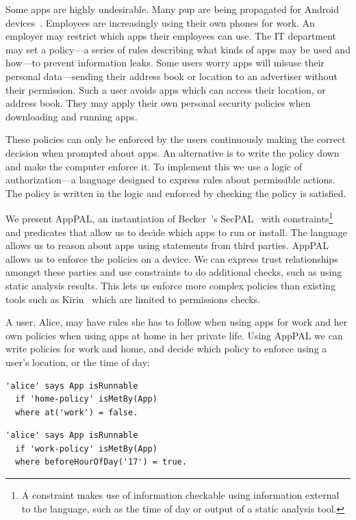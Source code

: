 \documentclass[]{llncs}
\begin{document}
Some apps are highly undesirable.
Many \ac{pup} are being propagated for Android devices~\cite{Truong:2014bi,Svajcer:2013tp}.
Employees are increasingly using their own phones for work.
An employer may restrict which apps their employees can use.
The IT department may set a policy---a series of rules describing what kinds of apps may be used and how---to prevent information leaks.
Some users worry apps will misuse their personal data---sending their address book or location to an advertiser without their permission.
Such a user avoids apps which can access their location, or address book.
They may apply their own personal security policies when downloading and running apps.

These policies can only be enforced by the users continuously making the correct decision when prompted about apps.
An alternative is to write the policy down and make the computer enforce it.
To implement this we use a logic of authorization---a language designed to express rules about permissible actions.
The policy is written in the logic and enforced by checking the policy is satisfied.

We present AppPAL, an instantiation of Becker~\etal's SecPAL~\cite{Becker:2006vh} with constraints\footnote{A constraint makes use of information checkable using information external to the language, such as the time of day or output of a static analysis tool.} and predicates that allow us to decide which apps to run or install.
The language allows us to reason about apps using statements from third parties.
AppPAL allows us to enforce the policies on a device.
We can express trust relationships amongst these parties and use constraints to do additional checks, such as using static analysis results.
This lets us enforce more complex policies than existing tools such as Kirin~\cite{Enck:2009ko} which are limited to permissions checks.

A user, Alice, may have rules she has to follow when using apps for work and her own policies when using apps at home in her private life.
Using AppPAL we can write policies for work and home, and decide which policy to enforce using a user's location, or the time of day:

\noindent
\begin{minipage}{\linewidth}
  \begin{minipage}{0.5\linewidth}
    \begin{lstlisting}
'alice' says App isRunnable
  if 'home-policy' isMetBy(App)
  where at('work') = false.
    \end{lstlisting}
  \end{minipage}
  \begin{minipage}{0.5\linewidth}
    \begin{lstlisting}
'alice' says App isRunnable
  if 'work-policy' isMetBy(App)
  where beforeHourOfDay('17') = true.
    \end{lstlisting}
  \end{minipage}
\end{minipage}
\end{document}

